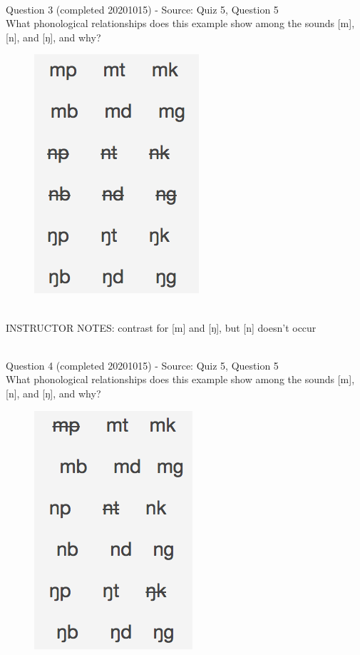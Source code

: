 \documentclass[12pt]{article}
\begin{document}
~\\

{\large Question 3} (completed 20201015) - Source: Quiz 5, Question 5\\

What phonological relationships does this example show among the sounds [m], [n], and [ŋ], and why?\\

\begin{figure}[H]
\includegraphics{../images/quiz4question5_c.png}
\end{figure}

~\\
INSTRUCTOR NOTES: contrast for [m] and [ŋ], but [n] doesn't occur


~\\

{\large Question 4} (completed 20201015) - Source: Quiz 5, Question 5\\

What phonological relationships does this example show among the sounds [m], [n], and [ŋ], and why?\\

\begin{figure}[H]
\includegraphics{../images/quiz4question5_d.png}
\end{figure}
\end{document}
